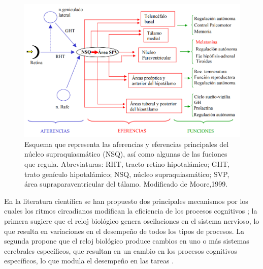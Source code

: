\documentclass[12pt,letterpaper,final]{article}
\let\cite\cite %
\begin{document}
\begin{figure}[ht]
	\centering
	\includegraphics[scale=0.45]{Vias-NSQ.png}
\begin{footnotesize}	
	\caption{Esquema que representa las aferencias y eferencias principales del núcleo supraquiasmático
		(NSQ), así como algunas de las fuciones que regula. Abreviaturas: RHT, tracto retino hipotalámico; GHT,
		trato genículo hipotalámico; NSQ, núcleo supraquiasmático; SVP, área supraparaventricular del tálamo.
		Modificado de Moore,1999.}
	\label{fig:EstructuraNSQ}
	\end{footnotesize}
\end{figure}



En la literatura científica se han propuesto dos principales mecanismos por los cuales los ritmos circadianos modifican la eficiencia de los procesos cognitivos \cite{Valdez2014}; la primera sugiere que el reloj biológico genera oscilaciones en el sistema nervioso, lo que resulta en variaciones en el desempeño de todos los tipos de procesos. La segunda propone que el reloj biológico produce cambios en uno o más sistemas cerebrales específicos, que resultan en un cambio en los procesos cognitivos específicos, lo que modula el desempeño en las tareas \cite{Valdez2014}.
\end{document}
